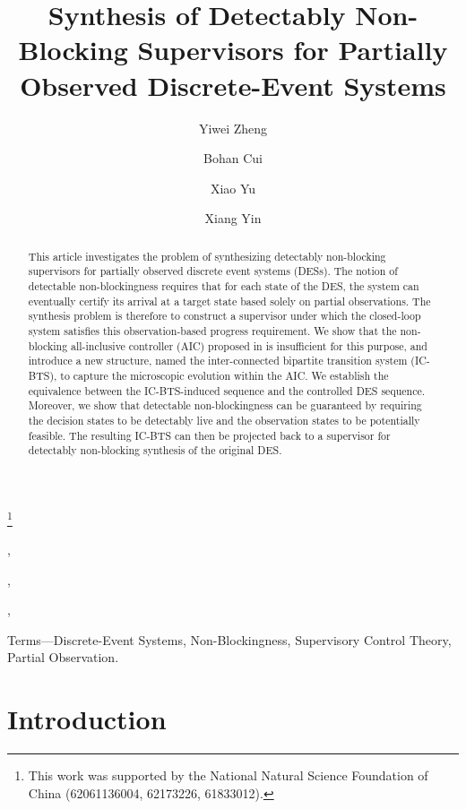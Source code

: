 \documentclass[twocolumn]{autart}
\begin{document}
\begin{frontmatter}
\title{Synthesis of Detectably Non-Blocking Supervisors for Partially Observed Discrete-Event Systems}

\thanks[footnoteinfo]{This work was supported by  the National Natural Science Foundation of China (62061136004, 62173226, 61833012).}
		\author[SJTU1]{Yiwei Zheng},  
		\author[SJTU1]{Bohan Cui},  
		\author[XMU]{Xiao Yu},
		\author[SJTU1]{Xiang Yin} 
		
		\address[SJTU1]{School of Automation and Intelligent Sensing, Shanghai Jiao Tong University, Shanghai 200240, China.}  \address[XMU]{Institute of Artificial Intelligence, Xiamen University, Xiamen 361005, China.}  


  \begin{keyword}
       Terms—Discrete-Event Systems,  Non-Blockingness, Supervisory Control Theory, Partial Observation.
  \end{keyword}
\begin{abstract}
This article investigates the problem of synthesizing detectably non-blocking supervisors for partially observed discrete event systems (DESs).
The notion of detectable non-blockingness requires that for each state of the DES, the system can eventually certify its arrival at a target state based solely on partial observations.
The synthesis problem is therefore to construct a supervisor under which the closed-loop system satisfies this observation-based progress requirement.
%
We show that the non-blocking all-inclusive controller (AIC) proposed in \cite{yin2016synthesis} is insufficient for this purpose, and introduce a new structure, named the inter-connected bipartite transition system (IC-BTS), to capture the microscopic evolution within the AIC.
We establish the equivalence between the IC-BTS-induced sequence and the controlled DES sequence.
Moreover, we show that detectable non-blockingness can be guaranteed by requiring the decision states to be detectably live and the observation states to be potentially feasible.
The resulting IC-BTS can then be projected back to a supervisor for detectably non-blocking synthesis of the original DES.
\end{abstract}
\end{frontmatter}	 

\section{Introduction}
\label{sec:intro}
\end{document}

